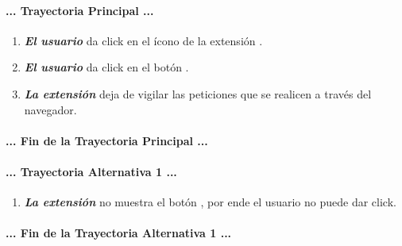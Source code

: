 \documentclass[12pt, a4paper, titlepage]{report}
\newcommand*{\img}[1]{%
    \raisebox{-.3\baselineskip}{%
        \texttt{[image: \#1]}%
    }%
}
\begin{document}
				\paragraph{... Trayectoria Principal ...}
				\begin{enumerate}
					\item \textbf{\textit{El usuario}} da click en el ícono de la extensión \img{imagenes/Disenio/Componente_1/escom.png}.
					\item \textbf{\textit{El usuario}} da click en el botón \img{imagenes/Disenio/Componente_1/boton_desactivar.png}.
					\item \textbf{\textit{La extensión}} deja de vigilar las peticiones que se realicen a través del navegador.
				\end{enumerate}
				\paragraph{... Fin de la Trayectoria Principal ...}
				
		        \paragraph{... Trayectoria Alternativa 1 ...}
				\begin{enumerate}
				     \item \textbf{\textit{La extensión}} no muestra el botón \img{imagenes/Disenio/Componente_1/boton_desactivar.png}, por ende el usuario no puede dar click.
				\end{enumerate}
				\paragraph{... Fin de la Trayectoria Alternativa 1 ...}
				
\end{document}
